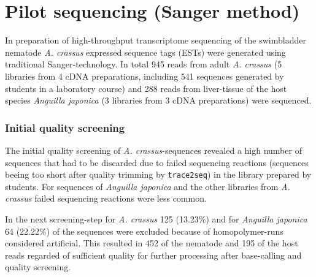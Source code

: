
\chapter{Pilot sequencing (Sanger method)} %
\label{pilot-seq}


\ifpdf
    \graphicspath{{3_pilot/figures/PNG/}{3_pilot/figures/PDF/}{3_pilot/figures/}}
\else
    \graphicspath{{3_pilot/figures/EPS/}{3_pilot/figures/}}
\fi


In preparation of high-throughput transcriptome sequencing of the
swimbladder nematode \textit{A. crassus} expressed sequence tags
(ESTs) were generated using traditional Sanger-technology. In total
945 reads from adult \textit{A. crassus} (5 libraries from 4 cDNA
preparations, including 541 sequences generated by students in a
laboratory course) and 288 reads from liver-tissue of the host species
\textit{Anguilla japonica} (3 libraries from 3 cDNA preparations) were
sequenced.

\subsection*{Initial quality screening}
\label{qual-pil}

The initial quality screening of \textit{A. crassus}-sequences
revealed a high number of sequences that had to be discarded due to
failed sequencing reactions (sequences beeing too short after quality
trimming by \texttt{trace2seq}) in the library prepared by
students. For sequences of \textit{Anguilla japonica} and the other
libraries from \textit{A. crassus} failed sequencing reactions were
less common.

In the next screening-step for \textit{A. crassus} 125 (13.23\%) and
for \textit{Anguilla japonica} 64 (22.22\%) of the sequences were
excluded because of homopolymer-runs considered artificial. This
resulted in 452 of the nematode and 195 of the host reads regarded of
sufficient quality for further processing after base-calling and
quality screening.

